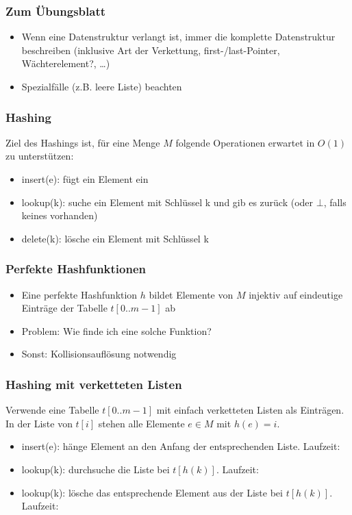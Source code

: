 

\begin{frame}
  \titlepage
\end{frame}

\begin{frame}
\frametitle{Zum Übungsblatt}
\begin{itemize}
\item Wenn eine Datenstruktur verlangt ist, immer die komplette Datenstruktur beschreiben (inklusive Art der Verkettung, first-/last-Pointer, Wächterelement?, \ldots)
\item Spezialfälle (z.B. leere Liste) beachten
\end{itemize}
\end{frame}

\begin{frame}
\frametitle{Hashing}
Ziel des Hashings ist, für eine Menge $M$ folgende Operationen erwartet in $O(1)$ zu unterstützen:
\begin{itemize}
\item insert(e): fügt ein Element ein
\item lookup(k): suche ein Element mit Schlüssel k und gib es zurück (oder $\bot$, falls keines vorhanden)
\item delete(k): lösche ein Element mit Schlüssel k
\end{itemize}
\end{frame}

\begin{frame}
\frametitle{Perfekte Hashfunktionen}
\begin{itemize}
\item Eine perfekte Hashfunktion $h$ bildet Elemente von $M$ injektiv auf eindeutige Einträge der Tabelle $t[0..m-1]$ ab\pause
\item Problem: Wie finde ich eine solche Funktion?\pause
\item Sonst: Kollisionsauflösung notwendig
\end{itemize}
\end{frame}

\begin{frame}
\frametitle{Hashing mit verketteten Listen}
Verwende eine Tabelle $t[0..m-1]$ mit einfach verketteten Listen als Einträgen. In der Liste von $t[i]$ stehen alle Elemente $e\in M$ mit $h(e)=i$.\pause
\begin{itemize}
\item insert(e): hänge Element an den Anfang der entsprechenden Liste. Laufzeit: 
\item lookup(k): durchsuche die Liste bei $t[h(k)]$. Laufzeit: 
\item lookup(k): lösche das entsprechende Element aus der Liste bei $t[h(k)]$. Laufzeit: 
\end{itemize}
\end{frame}

